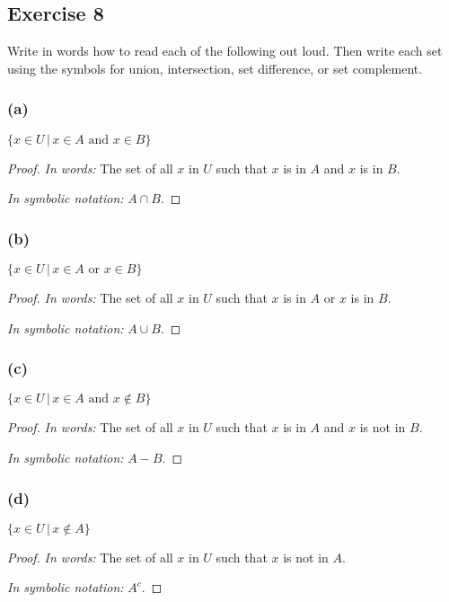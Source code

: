 \documentclass[14pt]{extarticle}
\begin{document}
\subsection{Exercise 8}
Write in words how to read each of the following out loud. Then write each set using the symbols for union,
intersection, set difference, or set complement.

\subsubsection{(a)}
\(\{x \in U \, | \, x \in A \text{ and } x \in B\}\)

\begin{proof}
  {\it In words:} The set of all $x$ in $U$ such that $x$ is in $A$ and $x$ is in $B$.

    {\it In symbolic notation:} \(A \cap B\).
\end{proof}

\subsubsection{(b)}
\(\{x \in U \, | \, x \in A \text{ or } x \in B\}\)

\begin{proof}
  {\it In words:} The set of all $x$ in $U$ such that $x$ is in $A$ or $x$ is in $B$.

    {\it In symbolic notation:} \(A \cup B\).
\end{proof}

\subsubsection{(c)}
\(\{x \in U \, | \, x \in A \text{ and } x \notin B\}\)

\begin{proof}
  {\it In words:} The set of all $x$ in $U$ such that $x$ is in $A$ and $x$ is not in $B$.

    {\it In symbolic notation:} \(A - B\).
\end{proof}

\subsubsection{(d)}
\(\{x \in U \, | \, x \notin A\}\)

\begin{proof}
  {\it In words:} The set of all $x$ in $U$ such that $x$ is not in $A$.

    {\it In symbolic notation:} \(A^c\).
\end{proof}
\end{document}
